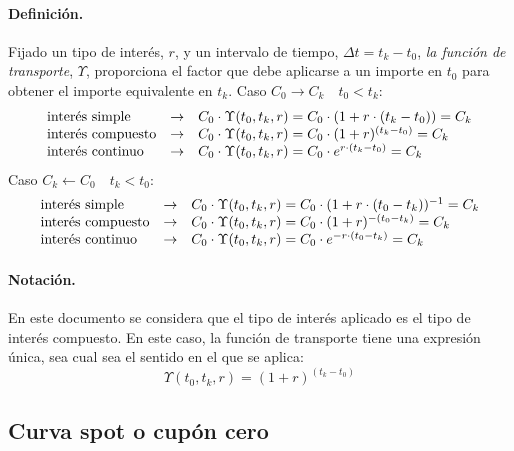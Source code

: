 \paragraph{Definici\'on.} Fijado un tipo de inter\'es, $r$, y un intervalo de
tiempo, $\Delta t = t_k-t_0$, \emph{la funci\'on de transporte},
$\Upsilon$, proporciona el factor que debe aplicarse a un importe en $t_0$ para obtener el
importe equivalente en $t_k$.
\newline
\newline
Caso $C_0 \longrightarrow C_k \quad t_0 < t_k$:
\begin{displaymath}
\begin{array}{lcl}
\textrm{inter\'es simple}    & \rightarrow & C_0 \cdot \Upsilon(t_0,t_k, r) = C_0 \cdot (1+r\cdot(t_k-t_0)) = C_k \cr
\textrm{inter\'es compuesto} & \rightarrow & C_0 \cdot \Upsilon(t_0,t_k, r) = C_0 \cdot (1+r)^{(t_k-t_0)} = C_k \cr
\textrm{inter\'es continuo}  & \rightarrow & C_0 \cdot \Upsilon(t_0,t_k, r) = C_0 \cdot e^{r\cdot(t_k-t_0)} = C_k 
\end{array}
\end{displaymath}
Caso $C_k \longleftarrow C_0 \quad t_k < t_0$:
\begin{displaymath}
\begin{array}{lcl}
\textrm{inter\'es simple}    & \rightarrow & C_0 \cdot \Upsilon(t_0,t_k, r) = C_0 \cdot (1+r\cdot(t_0-t_k))^{-1} = C_k \cr
\textrm{inter\'es compuesto} & \rightarrow & C_0 \cdot \Upsilon(t_0,t_k, r) = C_0 \cdot (1+r)^{-(t_0-t_k)} = C_k \cr
\textrm{inter\'es continuo}  & \rightarrow & C_0 \cdot \Upsilon(t_0,t_k, r) = C_0 \cdot e^{-r\cdot(t_0-t_k)} = C_k
\end{array}
\end{displaymath}

\paragraph{Notaci\'on.} En este documento se considera que el tipo de inter\'es
aplicado es el tipo de inter\'es compuesto. En este caso, la funci\'on de transporte
tiene una expresi\'on \'unica, sea cual sea el sentido en el que se aplica:
\begin{equation}
\label{funcion_transporte_1}
\Upsilon(t_0,t_k, r) = (1+r)^{(t_k-t_0)}
\end{equation}


\subsection{Curva spot o cup\'on cero}

